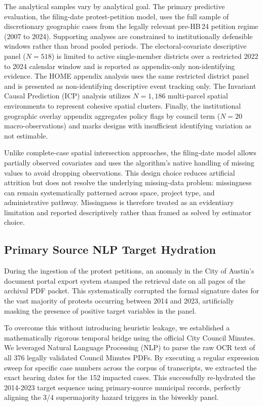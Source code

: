 \documentclass[11pt, letterpaper, oneside]{article}
\begin{document}
The analytical samples vary by analytical goal. The primary predictive evaluation, the filing-date protest-petition model, uses the full sample of \metricBaselineCases{} discretionary geographic cases from the legally relevant pre-HB\,24 petition regime (2007 to 2024). Supporting analyses are constrained to institutionally defensible windows rather than broad pooled periods. The electoral-covariate descriptive panel ($N=518$) is limited to active single-member districts over a restricted 2022 to 2024 calendar window and is reported as appendix-only non-identifying evidence. The HOME appendix analysis uses the same restricted district panel and is presented as non-identifying descriptive event tracking only. The Invariant Causal Prediction (ICP) analysis utilizes $N=1,186$ multi-parcel spatial environments to represent cohesive spatial clusters. Finally, the institutional geographic overlay appendix aggregates policy flags by council term ($N=20$ macro-observations) and marks designs with insufficient identifying variation as not estimable.

Unlike complete-case spatial intersection approaches, the filing-date model allows partially observed covariates and uses the algorithm's native handling of missing values to avoid dropping observations. This design choice reduces artificial attrition but does not resolve the underlying missing-data problem: missingness can remain systematically patterned across space, project type, and administrative pathway. Missingness is therefore treated as an evidentiary limitation and reported descriptively rather than framed as solved by estimator choice.

\subsection{Primary Source NLP Target Hydration}

During the ingestion of the protest petitions, an anomaly in the City of Austin's document portal export system stamped the retrieval date on all pages of the archival PDF packet. This systematically corrupted the formal signature dates for the vast majority of protests occurring between 2014 and 2023, artificially masking the presence of positive target variables in the panel. 

To overcome this without introducing heuristic leakage, we established a mathematically rigorous temporal bridge using the official City Council Minutes. We leveraged Natural Language Processing (NLP) to parse the raw OCR text of all 376 legally validated Council Minutes PDFs. By executing a regular expression sweep for specific case numbers across the corpus of transcripts, we extracted the exact hearing dates for the 152 impacted cases. This successfully re-hydrated the 2014-2023 target sequence using primary-source municipal records, perfectly aligning the 3/4 supermajority hazard triggers in the biweekly panel.
\end{document}
